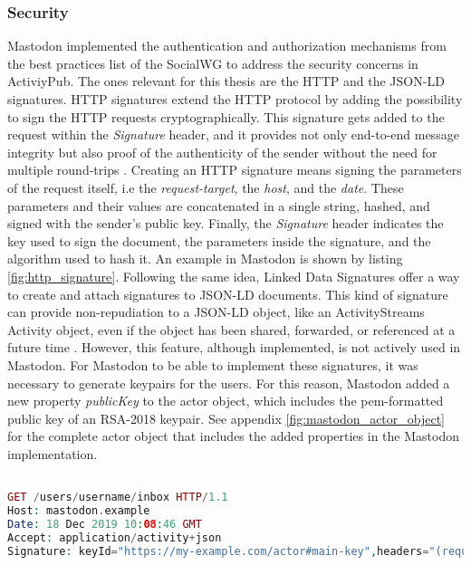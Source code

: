 \subsubsection*{\textbf{Security}}
Mastodon implemented the authentication and authorization mechanisms from the best practices list of the SocialWG to address the security concerns in ActiviyPub. The ones relevant for this thesis are the HTTP and the JSON-LD signatures. HTTP signatures extend the HTTP protocol by adding the possibility to sign the HTTP requests cryptographically. This signature gets added to the request within the \emph{Signature} header, and it provides not only end-to-end message integrity but also proof of the authenticity of the sender without the need for multiple round-trips \cite{cavage_sporny_2019}. Creating an HTTP signature means signing the parameters of the request itself, i.e the \emph{request-target}, the \emph{host}, and the \emph{date}. These parameters and their values are concatenated in a single string, hashed, and signed with the sender's public key. Finally, the \emph{Signature} header indicates the key used to sign the document, the parameters inside the signature, and the algorithm used to hash it. An example in Mastodon is shown by listing \ref{fig:http_signature}. 
Following the same idea, Linked Data Signatures offer a way to create and attach signatures to JSON-LD documents. This kind of signature can provide non-repudiation to a JSON-LD object, like an ActivityStreams Activity object, even if the object has been shared, forwarded, or referenced at a future time \cite{celik_prodromou_le_hors_2014}. However, this feature, although implemented, is not actively used in Mastodon. For Mastodon to be able to implement these signatures, it was necessary to generate keypairs for the users. For this reason, Mastodon added a new property \emph{publicKey} to the actor object, which includes the pem-formatted public key of an RSA-2018 keypair. See appendix \ref{fig:mastodon_actor_object} for the complete actor object that includes the added properties in the Mastodon implementation.

\lstset{style=JSONStyle}
\begin{lstlisting}[language=PHP, caption=Signed HTTP Request, label=fig:http_signature, float=h]

GET /users/username/inbox HTTP/1.1
Host: mastodon.example
Date: 18 Dec 2019 10:08:46 GMT
Accept: application/activity+json
Signature: keyId="https://my-example.com/actor#main-key",headers="(request-target) host date",signature="Y2FiYW...IxNGRiZDk4ZA=="

\end{lstlisting}

